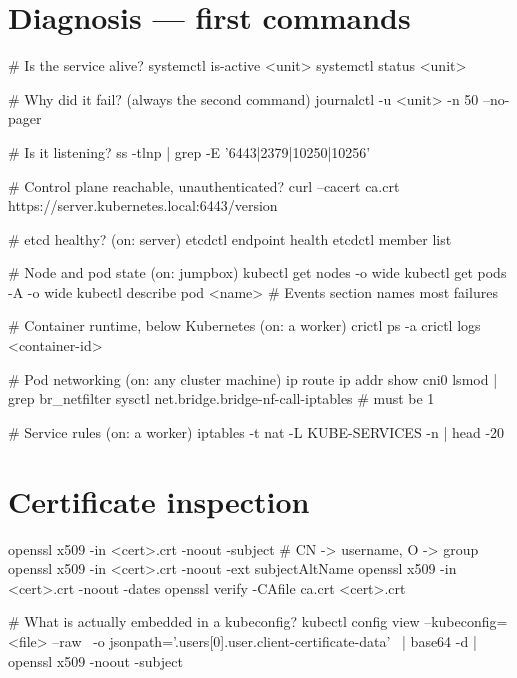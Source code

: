 \documentclass[11pt,oneside]{report}
\begin{document}
\hypertarget{diagnosis-first-commands}{%
\section{Diagnosis
--- first
commands}\label{diagnosis-first-commands}}

\begin{cmdlst}
# Is the service alive?
systemctl is-active <unit>
systemctl status <unit>

# Why did it fail? (always the second command)
journalctl -u <unit> -n 50 --no-pager

# Is it listening?
ss -tlnp | grep -E '6443|2379|10250|10256'

# Control plane reachable, unauthenticated?
curl --cacert ca.crt https://server.kubernetes.local:6443/version

# etcd healthy?                             (on: server)
etcdctl endpoint health
etcdctl member list

# Node and pod state                        (on: jumpbox)
kubectl get nodes -o wide
kubectl get pods -A -o wide
kubectl describe pod <name>        # Events section names most failures

# Container runtime, below Kubernetes       (on: a worker)
crictl ps -a
crictl logs <container-id>

# Pod networking                            (on: any cluster machine)
ip route
ip addr show cni0
lsmod | grep br_netfilter
sysctl net.bridge.bridge-nf-call-iptables   # must be 1

# Service rules                             (on: a worker)
iptables -t nat -L KUBE-SERVICES -n | head -20
\end{cmdlst}

\hypertarget{certificate-inspection}{%
\section{Certificate
inspection}\label{certificate-inspection}}

\begin{cmdlst}
openssl x509 -in <cert>.crt -noout -subject          # CN -> username, O -> group
openssl x509 -in <cert>.crt -noout -ext subjectAltName
openssl x509 -in <cert>.crt -noout -dates
openssl verify -CAfile ca.crt <cert>.crt

# What is actually embedded in a kubeconfig?
kubectl config view --kubeconfig=<file> --raw \
  -o jsonpath='{.users[0].user.client-certificate-data}' \
  | base64 -d | openssl x509 -noout -subject
\end{cmdlst}
\end{document}
